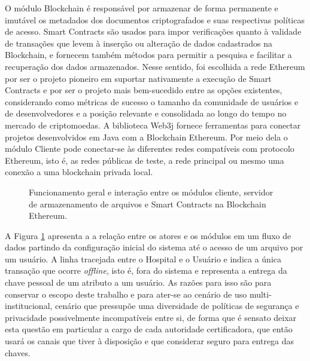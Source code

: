 \documentclass[a4paper,11pt]{article}
\begin{document}
O módulo Blockchain é responsável por armazenar de forma permanente e imutável {\color{blue}os metadados} dos documentos criptografados e suas respectivas políticas de acesso.
Smart Contracts são usados para impor verificações quanto à validade de transações que levem à inserção ou alteração de dados cadastrados na Blockchain, e fornecem também métodos para permitir a pesquisa e facilitar a recuperação dos dados armazenados.
Nesse sentido, foi escolhida a rede Ethereum por ser o projeto pioneiro em suportar nativamente a execução de Smart Contracts e por ser o projeto mais bem-sucedido entre as opções existentes, considerando como métricas de sucesso o tamanho da comunidade de usuários e de desenvolvedores e a posição relevante e consolidada ao longo do tempo no mercado de criptomoedas. %
A biblioteca Web3j fornece ferramentas para conectar projetos desenvolvidos em Java com a Blockchain Ethereum.
Por meio dela o módulo Cliente pode conectar-se às diferentes redes compatíveis com protocolo Ethereum, isto é, as redes públicas de teste, a rede principal ou mesmo uma conexão a uma blockchain privada local. %


\begin{figure}[H]
  \centering
  
  \caption{Funcionamento geral e interação entre os módulos cliente, servidor de armazenamento de arquivos e Smart Contracts na Blockchain Ethereum.}
  \label{fig:diagramaSmartDCPABE}
\end{figure}


A Figura \ref{fig:diagramaSmartDCPABE} apresenta a a relação entre os atores e os módulos em um fluxo de dados partindo da configuração inicial do sistema até o acesso de um arquivo por um usuário.
A linha tracejada entre o Hospital e o Usuário e indica a única transação que ocorre \emph{offline}, isto é, fora do sistema e representa a entrega da chave pessoal de um atributo a um usuário.
As razões para isso são para conservar o escopo deste trabalho e para ater-se ao cenário de uso multi-institucional, cenário que pressupõe uma diversidade de políticas de segurança e privacidade possivelmente incompatíveis entre si, de forma que é sensato deixar esta questão em particular a cargo de cada autoridade certificadora, que então usará os canais que tiver à disposição e que considerar seguro para entrega das chaves.
\end{document}
